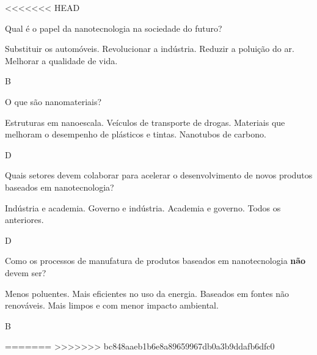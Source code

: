 \documentclass[10pt]{scrartcl}
\begin{document}



<<<<<<< HEAD
\begin{exercise}[points=1]
Qual é o papel da nanotecnologia na sociedade do futuro?
\begin{choice}
\choice Substituir os automóveis.
\choice Revolucionar a indústria.
\choice Reduzir a poluição do ar.
\choice Melhorar a qualidade de vida.
\end{choice}
\end{exercise}
\begin{solution}
B
\end{solution}





\begin{exercise}[points=1]
O que são nanomateriais?
\begin{choice}
\choice Estruturas em nanoescala.
\choice Veículos de transporte de drogas.
\choice Materiais que melhoram o desempenho de plásticos e tintas.
\choice Nanotubos de carbono.
\end{choice}
\end{exercise}
\begin{solution}
D
\end{solution}





\begin{exercise}[points=1]
Quais setores devem colaborar para acelerar o desenvolvimento de novos produtos baseados em nanotecnologia?
\begin{choice}
\choice Indústria e academia.
\choice Governo e indústria.
\choice Academia e governo.
\choice Todos os anteriores.
\end{choice}
\end{exercise}
\begin{solution}
D
\end{solution}


\begin{exercise}[points=1]
Como os processos de manufatura de produtos baseados em nanotecnologia \textbf{não} devem ser?
\begin{choice}
\choice Menos poluentes.
\choice Mais eficientes no uso da energia.
\choice Baseados em fontes não renováveis.
\choice Mais limpos e com menor impacto ambiental.
\end{choice}
\end{exercise}
\begin{solution}
B
\end{solution}







=======
>>>>>>> bc848aaeb1b6e8a89659967db0a3b9ddafb6dfc0
\end{document}
